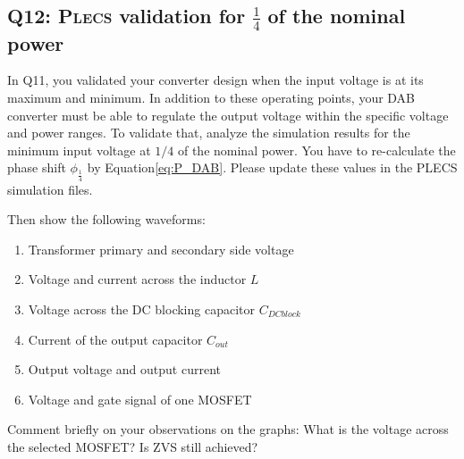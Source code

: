 \documentclass{PELsmallreport}
\begin{document}
\hfill{}

\clearpage

\subsection{Q12: \textsc{Plecs} validation for $\frac{1}{4}$ of the nominal power} 
In Q11, you validated your converter design when the input voltage is at its maximum and minimum. 
In addition to these operating points, your DAB converter must be able to regulate the output voltage within the specific voltage and power ranges. To validate that, analyze the simulation results for the minimum input voltage at $1/4$ of the nominal power. You have to re-calculate  the phase shift $\phi_{\frac{1}{4}}$ by Equation\ref{eq:P_DAB}. Please update these values in the PLECS simulation files.

Then show the following waveforms:
\vspace{0.4em}
\begin{enumerate}[label=\alph*)]
    \item Transformer primary and secondary side voltage
    \item Voltage and current across the inductor $L$
    \item Voltage across the DC blocking capacitor $C_{DCblock}$
    \item Current of the output capacitor $C_{out}$
    \item Output voltage and output current
    \item Voltage and gate signal of one MOSFET 
\end{enumerate}
\vspace{0.6em}
Comment briefly on your observations on the graphs: What is the voltage across the selected MOSFET? Is ZVS still achieved?
\end{document}
